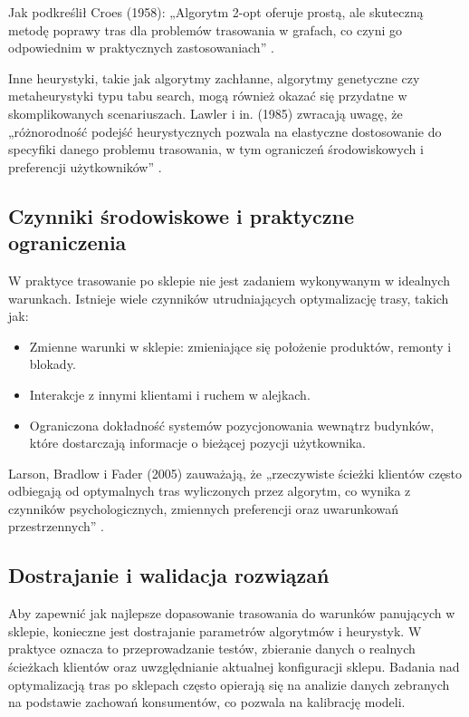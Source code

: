 Jak podkreślił Croes (1958): „Algorytm 2-opt oferuje prostą, ale skuteczną metodę poprawy tras dla problemów trasowania w grafach, co czyni go odpowiednim w praktycznych zastosowaniach” \cite{Croes1958}.

Inne heurystyki, takie jak algorytmy zachłanne, algorytmy genetyczne czy metaheurystyki typu tabu search, mogą również okazać się przydatne w skomplikowanych scenariuszach. Lawler i in. (1985) zwracają uwagę, że „różnorodność podejść heurystycznych pozwala na elastyczne dostosowanie do specyfiki danego problemu trasowania, w tym ograniczeń środowiskowych i preferencji użytkowników” \cite{Lawler1985}.

\subsection{Czynniki środowiskowe i praktyczne ograniczenia}
W praktyce trasowanie po sklepie nie jest zadaniem wykonywanym w idealnych warunkach. Istnieje wiele czynników utrudniających optymalizację trasy, takich jak:
\begin{itemize}
    \item Zmienne warunki w sklepie: zmieniające się położenie produktów, remonty i blokady.
    \item Interakcje z innymi klientami i ruchem w alejkach.
    \item Ograniczona dokładność systemów pozycjonowania wewnątrz budynków, które dostarczają informacje o bieżącej pozycji użytkownika.
\end{itemize}

Larson, Bradlow i Fader (2005) zauważają, że „rzeczywiste ścieżki klientów często odbiegają od optymalnych tras wyliczonych przez algorytm, co wynika z czynników psychologicznych, zmiennych preferencji oraz uwarunkowań przestrzennych” \cite{Larson2005}.

\subsection{Dostrajanie i walidacja rozwiązań}
Aby zapewnić jak najlepsze dopasowanie trasowania do warunków panujących w sklepie, konieczne jest dostrajanie parametrów algorytmów i heurystyk. W praktyce oznacza to przeprowadzanie testów, zbieranie danych o realnych ścieżkach klientów oraz uwzględnianie aktualnej konfiguracji sklepu. Badania nad optymalizacją tras po sklepach często opierają się na analizie danych zebranych na podstawie zachowań konsumentów, co pozwala na kalibrację modeli.

